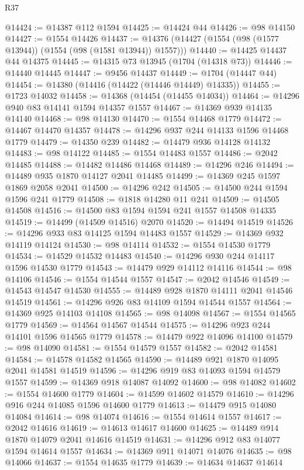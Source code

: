 \begin{lexlean}{R37}
\begin{coremodule}
@14424 := @14387 @112 @1594
@14425 := @14424 @44
@14426 := @98 @14150
@14427 := @1554 @14426
@14437 := @14376 (@14427 (@1554 (@98 (@1577 @13944)) (@1554 (@98 (@1581 @13944)) @1557)))
@14440 := @14425 @14437 @44 @14375
@14445 := @14315 @73 @13945 (@1704 (@14318 @73))
@14446 := @14440 @14445
@14447 := @9456 @14437
@14449 := @1704 (@14447 @44)
@14454 := @14380 (@14416 (@14422 (@14446 @14449) @14335))
@14455 := @1723 @14032
@14458 := @14368 (@14454 (@14455 @14034))
@14464 := @14296 @940 @83 @14141 @1594 @14357 @1557
@14467 := @14369 @939 @14135 @14140
@14468 := @98 @14130
@14470 := @1554 @14468 @1779
@14472 := @14467 @14470 @14357
@14478 := @14296 @937 @244 @14133 @1596 @14468 @1779
@14479 := @14350 @239
@14482 := @14479 @936 @14128 @14132
@14483 := @98 @14122
@14485 := @1554 @14483 @1557
@14486 := @2042 @14485
@14488 := @14482 @14486 @14468
@14489 := @14296 @246
@14494 := @14489 @935 @1870 @14127 @2041 @14485
@14499 := @14369 @245 @1597 @1869 @2058 @2041
@14500 := @14296 @242
@14505 := @14500 @244 @1594 @1596 @241 @1779
@14508 := @1818 @14280 @11 @241
@14509 := @14505 @14508
@14516 := @14500 @83 @1594 @1594 @241 @1557 @14508 @14335
@14519 := @14499 (@14509 @14516) @2070
@14520 := @14494 @14519
@14526 := @14296 @933 @83 @14125 @1594 @14483 @1557
@14529 := @14369 @932 @14119 @14124
@14530 := @98 @14114
@14532 := @1554 @14530 @1779
@14534 := @14529 @14532 @14483
@14540 := @14296 @930 @244 @14117 @1596 @14530 @1779
@14543 := @14479 @929 @14112 @14116
@14544 := @98 @14106
@14546 := @1554 @14544 @1557
@14547 := @2042 @14546
@14549 := @14543 @14547 @14530
@14555 := @14489 @928 @1870 @14111 @2041 @14546 @14519
@14561 := @14296 @926 @83 @14109 @1594 @14544 @1557
@14564 := @14369 @925 @14103 @14108
@14565 := @98 @14098
@14567 := @1554 @14565 @1779
@14569 := @14564 @14567 @14544
@14575 := @14296 @923 @244 @14101 @1596 @14565 @1779
@14578 := @14479 @922 @14096 @14100
@14579 := @98 @14090
@14581 := @1554 @14579 @1557
@14582 := @2042 @14581
@14584 := @14578 @14582 @14565
@14590 := @14489 @921 @1870 @14095 @2041 @14581 @14519
@14596 := @14296 @919 @83 @14093 @1594 @14579 @1557
@14599 := @14369 @918 @14087 @14092
@14600 := @98 @14082
@14602 := @1554 @14600 @1779
@14604 := @14599 @14602 @14579
@14610 := @14296 @916 @244 @14085 @1596 @14600 @1779
@14613 := @14479 @915 @14080 @14084
@14614 := @98 @14074
@14616 := @1554 @14614 @1557
@14617 := @2042 @14616
@14619 := @14613 @14617 @14600
@14625 := @14489 @914 @1870 @14079 @2041 @14616 @14519
@14631 := @14296 @912 @83 @14077 @1594 @14614 @1557
@14634 := @14369 @911 @14071 @14076
@14635 := @98 @14066
@14637 := @1554 @14635 @1779
@14639 := @14634 @14637 @14614

\end{coremodule}
\end{lexlean}
